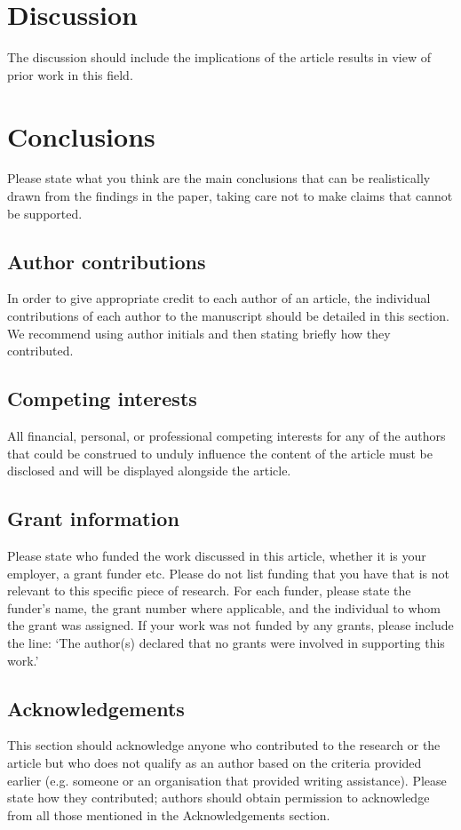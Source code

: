 \documentclass[10pt,a4paper,twocolumn]{article}
\begin{document}
\section*{Discussion}
The discussion should include the implications of the article results in view of prior work in this field.

\section*{Conclusions}
Please state what you think are the main conclusions that can be realistically drawn from the findings in the paper, taking care not to make claims that cannot be supported.



\subsection*{Author contributions}
In order to give appropriate credit to each author of an article, the individual
contributions of each author to the manuscript should be detailed in this section. We
recommend using author initials and then stating briefly how they contributed.

\subsection*{Competing interests}
All financial, personal, or professional competing interests for any of the authors that
could be construed to unduly influence the content of the article must be disclosed and
will be displayed alongside the article.

\subsection*{Grant information}
Please state who funded the work discussed in this article, whether it is your employer,
a grant funder etc. Please do not list funding that you have that is not relevant to this
specific piece of research. For each funder, please state the funder’s name, the grant
number where applicable, and the individual to whom the grant was assigned.
If your work was not funded by any grants, please include the line: ‘The author(s)
declared that no grants were involved in supporting this work.’

\subsection*{Acknowledgements}
This section should acknowledge anyone who contributed to the research or the
article but who does not qualify as an author based on the criteria provided earlier
(e.g. someone or an organisation that provided writing assistance). Please state how
they contributed; authors should obtain permission to acknowledge from all those
mentioned in the Acknowledgements section.
\end{document}
